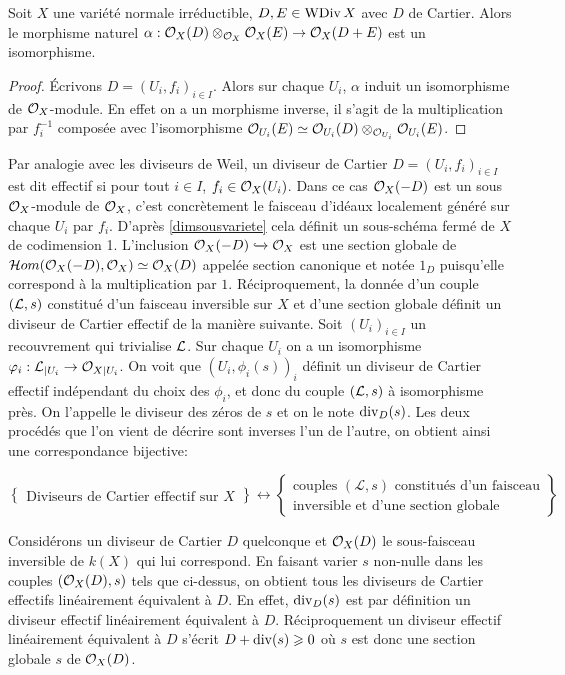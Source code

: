 \begin{prop}
Soit $X$ une variété normale irréductible, $D,E\in\operatorname{WDiv} X$ avec $D$ de Cartier. Alors le morphisme naturel $\alpha:\mathcal{O}_X(D)\otimes_{\mathcal{O}_X}\mathcal{O}_X(E)\rightarrow \mathcal{O}_X(D+E)$ est un isomorphisme.
\end{prop}
\begin{proof}
Écrivons $D=(U_i,f_i)_{i\in I}$. Alors sur chaque $U_i$, $\alpha$ induit un isomorphisme de $\mathcal{O}_X$-module. En effet on a un morphisme inverse, il s'agit de la multiplication par $f_i^{-1}$ composée avec l'isomorphisme  $\mathcal{O}_{U_i}(E)\simeq   \mathcal{O}_{U_i}(D)\otimes_{\mathcal{O}_{U_i}}\mathcal{O}_{U_i}(E)$.
\end{proof}

Par analogie avec les diviseurs de Weil, un diviseur de Cartier $D=(U_i, f_i)_{i\in I}$ est dit effectif si pour tout $i\in I$, $f_i\in \mathcal{O}_X(U_i)$. Dans ce cas $\mathcal{O}_X(-D)$ est un sous $\mathcal{O}_X$-module de $\mathcal{O}_X$, c'est concrètement le faisceau d'idéaux localement généré sur chaque $U_i$ par $f_i$. D'après \ref{dimsousvariete} cela définit un sous-schéma fermé de $X$ de codimension 1. L'inclusion $\mathcal{O}_X(-D)\xhookrightarrow{} \mathcal{O}_X$ est une section globale de $\mathcal{H} om(\mathcal{O}_X(-D), \mathcal{O}_X)\simeq \mathcal{O}_X(D)$ appelée section canonique et notée $1_D$ puisqu'elle correspond à la multiplication par $1$. Réciproquement, la donnée d'un couple $(\mathcal{L}, s)$ constitué d'un faisceau inversible sur $X$ et d'une section globale définit un diviseur de Cartier effectif de la manière suivante. Soit $(U_i)_{i\in I}$ un recouvrement qui trivialise $\mathcal{L}$. Sur chaque $U_i$ on a un isomorphisme $\varphi_i:\mathcal{L}_{|U_i}\rightarrow\mathcal{O}_{X|U_i}$. On voit que $(U_i,\phi_i(s))_i$ définit un diviseur de Cartier effectif indépendant du choix des $\phi_i$, et donc du couple $(\mathcal{L},s)$ à isomorphisme près. On l'appelle le diviseur des zéros de $s$ et on le note $\operatorname{div}_D(s)$. Les deux procédés que l'on vient de décrire sont inverses l'un de l'autre, on obtient ainsi une correspondance bijective:

$$
\left\{
\begin{matrix}
\text{Diviseurs de Cartier effectif sur }X
\end{matrix}
\right\}
\leftrightarrow
\left\{
\begin{matrix}
\text{couples }(\mathcal{L}, s)\text{ constitués d'un faisceau}\\
\text{inversible et d'une section globale}
\end{matrix}
\right\}
$$

Considérons un diviseur de Cartier $D$ quelconque et $\mathcal{O}_X(D)$ le sous-faisceau inversible de $k(X)$ qui lui correspond. En faisant varier $s$ non-nulle dans les couples $(\mathcal{O}_X(D),s)$ tels que ci-dessus, on obtient tous les diviseurs de Cartier effectifs linéairement équivalent à $D$. En effet, $\operatorname{div}_D(s)$ est par définition un diviseur effectif linéairement équivalent à $D$. Réciproquement un diviseur effectif linéairement équivalent à $D$ s'écrit $D+\operatorname{div}(s)\geqslant 0$ où $s$ est donc une section globale $s$ de $\mathcal{O}_X(D)$.

